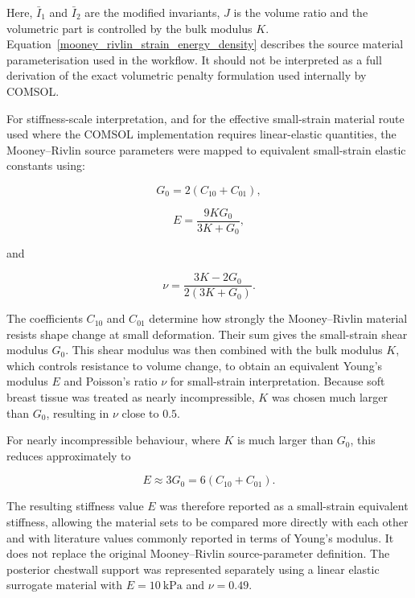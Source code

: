 Here, $\bar{I}_{1}$ and $\bar{I}_{2}$ are the modified invariants, $J$ is the volume ratio and the volumetric part is controlled by the bulk modulus $K$. Equation~\ref{mooney_rivlin_strain_energy_density} describes the source material parameterisation used in the workflow. It should not be interpreted as a full derivation of the exact volumetric penalty formulation used internally by COMSOL.

For stiffness-scale interpretation, and for the effective small-strain material route used where the COMSOL implementation requires linear-elastic quantities, the Mooney--Rivlin source parameters were mapped to equivalent small-strain elastic constants using:

\begin{equation}
G_{0}
=
2\left(C_{10}+C_{01}\right),
\label{small_strain_shear_modulus_from_mooney_rivlin}
\end{equation}

\begin{equation}
E
=
\frac{9KG_{0}}{3K+G_{0}},
\label{small_strain_youngs_modulus_from_bulk_and_shear}
\end{equation}

and

\begin{equation}
\nu
=
\frac{3K-2G_{0}}{2\left(3K+G_{0}\right)}.
\label{small_strain_poisson_ratio_from_bulk_and_shear}
\end{equation}

The coefficients $C_{10}$ and $C_{01}$ determine how strongly the Mooney--Rivlin material resists shape change at small deformation. Their sum gives the small-strain shear modulus $G_{0}$. This shear modulus was then combined with the bulk modulus $K$, which controls resistance to volume change, to obtain an equivalent Young's modulus $E$ and Poisson's ratio $\nu$ for small-strain interpretation. Because soft breast tissue was treated as nearly incompressible, $K$ was chosen much larger than $G_{0}$, resulting in $\nu$ close to $0.5$.

For nearly incompressible behaviour, where $K$ is much larger than $G_{0}$, this reduces approximately to

\begin{equation}
E
\approx
3G_{0}
=
6\left(C_{10}+C_{01}\right).
\label{nearly_incompressible_stiffness_scale}
\end{equation}

The resulting stiffness value $E$ was therefore reported as a small-strain equivalent stiffness, allowing the material sets to be compared more directly with each other and with literature values commonly reported in terms of Young's modulus. It does not replace the original Mooney--Rivlin source-parameter definition. The posterior chestwall support was represented separately using a linear elastic surrogate material with $E=10~\mathrm{kPa}$ and $\nu=0.49$.




